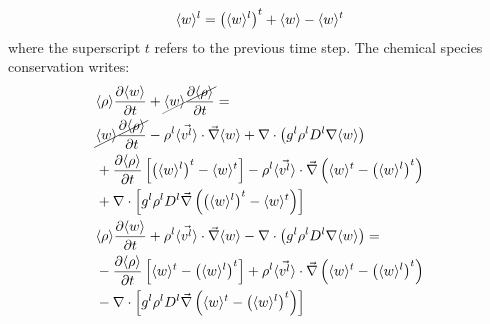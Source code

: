 \begin{align}
\wl = \brac{\wl}^t + \avg{w} - \avg{w}^t
\end{align}
%
where the superscript $t$ refers to the previous time step. The chemical species conservation writes:
%
\begin{subequations}
\begin{align}
  \begin{split}
	& \avg{\rho} \tempup{\avg{w}}  + \cancel{\avg{w} \tempup{\avg{\rho}}} = \\
	& \cancel{\avg{w} \tempup{\avg{\rho}}}  - \rhol \vit \cdot \nabvec \avg{w} + \nabla \cdot \brac{\gl \rhol \Dl \nabla \avg{w} } \\
	& + \tempup{\avg{\rho}} \crochet{\brac{\wl}^t -  \avg{w}^t} - \rhol \vit \cdot \nabvec \brac{\avg{w}^t -\brac{\wl}^t} \\
	& + \nabla \cdot \crochet{\gl \rhol \Dl  \nabvec \brac{ \brac{\wl}^t - \avg{w}^t } }
  \end{split} \\ 
    \begin{split}
	& \avg{\rho} \tempup{\avg{w}}  + \rhol \vit \cdot \nabvec \avg{w} - \nabla \cdot \brac{\gl \rhol \Dl \nabla \avg{w}}=\\
	& - \tempup{\avg{\rho}} \crochet{\avg{w}^t - \brac{\wl}^t} + \rhol \vit \cdot \nabvec \brac{\avg{w}^t -\brac{\wl}^t} \\
	& - \nabla \cdot \crochet{\gl \rhol \Dl  \nabvec \brac{\avg{w}^t -\brac{\wl}^t} }
  \end{split}
\end{align}
\end{subequations}
%
